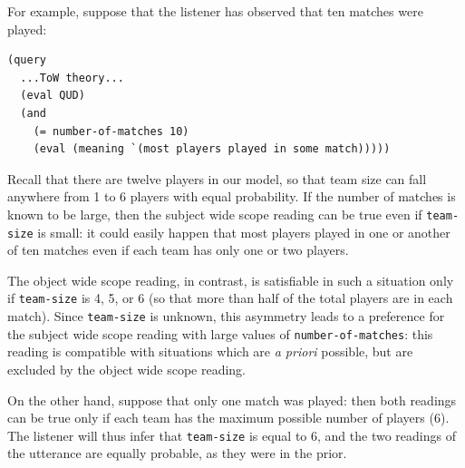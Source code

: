 \documentclass[pdfextras]{handbook}
\begin{document}
For example, suppose that the listener has observed that ten matches were played:
\begin{lstlisting}
(query
  ...ToW theory...
  (eval QUD)
  (and 
    (= number-of-matches 10)
    (eval (meaning `(most players played in some match)))))
\end{lstlisting}
Recall that there are twelve players in our model, so that team size can fall anywhere from 1 to 6 players with equal probability. 
If the number of matches is known to be large, then the subject wide scope reading can be true even if \lstinline{team-size} is small: it could easily happen that most players played in one or another of ten matches even if each team has only one or two players. 

The object wide scope reading, in contrast, is satisfiable in such a situation only if \lstinline{team-size} is 4, 5, or 6 (so that more than half of the total players are in each match). 
Since \lstinline{team-size} is unknown, this asymmetry leads to a preference for the subject wide scope reading with large values of \lstinline{number-of-matches}: this reading is compatible with situations which are \emph{a priori} possible, but are excluded by the object wide scope reading. 

On the other hand, suppose that only one match was played: then both readings can be true only if each team has the maximum possible number of players (6). 
The listener will thus infer that \lstinline{team-size} is equal to 6, and the two readings of the utterance are equally probable, as they were in the prior.
\end{document}
